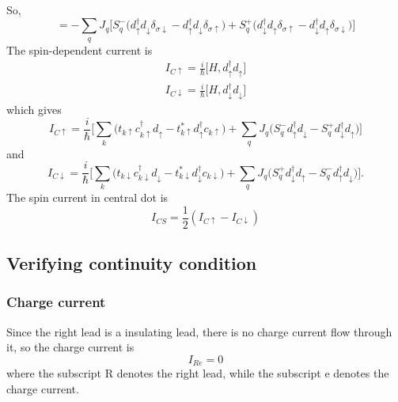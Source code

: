 \documentclass[11pt,a4paper]{book}
\begin{document}
So,
\begin{equation}
[V_{R},  d_{\sigma}^{\dag}d_{\sigma}] =  -\sum_{q}J_{q}\big[ S_{q}^{-} \big( d_{\uparrow}^{\dag}d_{\downarrow}\delta_{\sigma \downarrow} - d_{\uparrow}^{\dag}d_{\downarrow}\delta_{\sigma \uparrow} \big) + S_{q}^{+}\big(d_{\downarrow}^{\dag}d_{\uparrow}\delta_{\sigma \uparrow} - d_{\downarrow}^{\dag}d_{\uparrow}\delta_{\sigma \downarrow} \big)\big]
\end{equation}
The spin-dependent current is
\begin{eqnarray}
I_{C\uparrow} = \frac{i}{\hbar}\big[ H, d_{\uparrow}^{\dag} d_{\uparrow} \big]
\\
I_{C\downarrow} = \frac{i}{\hbar}\big[ H, d_{\downarrow}^{\dag} d_{\downarrow} \big]
\end{eqnarray}
which gives
\begin{equation}
I_{C\uparrow} = \frac{i}{\hbar} \big[ \sum_{k}\big(t_{k\uparrow} c_{k\uparrow}^{\dag}d_{\uparrow} - t_{k\uparrow}^{*} d_{\uparrow}^{\dag}c_{k\uparrow} \big) + \sum_{q}J_{q}\big( S_{q}^{-} d_{\uparrow}^{\dag}d_{\downarrow} - S_{q}^{+}d_{\downarrow}^{\dag}d_{\uparrow} \big)\big]
\end{equation}
and
\begin{equation}
I_{C\downarrow} = \frac{i}{\hbar} \big[ \sum_{k}\big(t_{k\downarrow} c_{k\downarrow}^{\dag}d_{\downarrow} - t_{k\downarrow}^{*} d_{\downarrow}^{\dag}c_{k\downarrow} \big) + \sum_{q}J_{q}\big(S_{q}^{+}d_{\downarrow}^{\dag}d_{\uparrow} -  S_{q}^{-} d_{\uparrow}^{\dag}d_{\downarrow} \big)\big].
\end{equation}
The spin current in central dot is
\begin{equation}
I_{CS} = \frac{1}{2}(I_{C\uparrow} - I_{C\downarrow})
\end{equation}

\subsection{Verifying continuity condition}
\subsubsection{Charge current}
Since the right lead is a insulating lead, there is no charge current flow through it, so the charge current is
\begin{equation}
I_{Re} = 0
\end{equation}
where the subscript R denotes the right lead, while the subscript e denotes the charge current.
\end{document}

